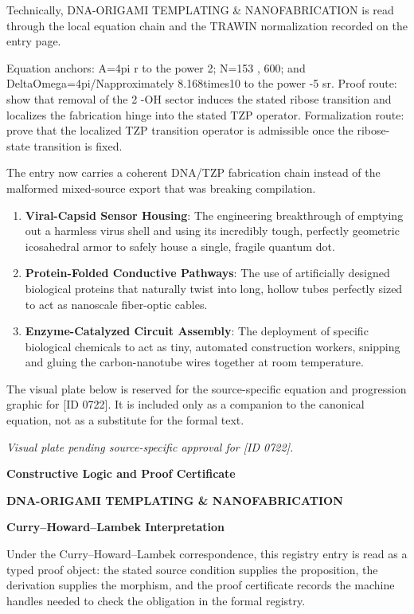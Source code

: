Technically, DNA-ORIGAMI TEMPLATING \& NANOFABRICATION is read through the local equation chain and the TRAWIN normalization recorded on the entry page.

Equation anchors: A=4pi r to the power 2; N=153 , 600; and DeltaOmega=4pi/Napproximately 8.168times10 to the power -5 sr. Proof route: show that removal of the 2 -OH sector induces the stated ribose transition and localizes the fabrication hinge into the stated TZP operator. Formalization route: prove that the localized TZP transition operator is admissible once the ribose-state transition is fixed.

The entry now carries a coherent DNA/TZP fabrication chain instead of the malformed mixed-source export that was breaking compilation.
\endgroup

\begin{enumerate}[leftmargin=1.6em,itemsep=6pt,topsep=4pt]
\item \textbf{Viral-Capsid Sensor Housing}: The engineering breakthrough of emptying out a harmless virus shell and using its incredibly tough, perfectly geometric icosahedral armor to safely house a single, fragile quantum dot.
\item \textbf{Protein-Folded Conductive Pathways}: The use of artificially designed biological proteins that naturally twist into long, hollow tubes perfectly sized to act as nanoscale fiber-optic cables.
\item \textbf{Enzyme-Catalyzed Circuit Assembly}: The deployment of specific biological chemicals to act as tiny, automated construction workers, snipping and gluing the carbon-nanotube wires together at room temperature.
\end{enumerate}

\begingroup\footnotesize\sloppy
The visual plate below is reserved for the source-specific equation and progression graphic for [ID 0722]. It is included only as a companion to the canonical equation, not as a substitute for the formal text.
\par\endgroup
\begingroup\footnotesize\itshape
Visual plate pending source-specific approval for [ID 0722].
\par\endgroup

\clearpage
\begingroup\tzpsupportsetup
\noindent\textbf{\fontsize{10.8pt}{12.8pt}\selectfont [ID 0722] Constructive Logic and Proof Certificate}\par
\noindent\textbf{\fontsize{10pt}{12pt}\selectfont DNA-ORIGAMI TEMPLATING \& NANOFABRICATION}\par
\vspace{0.45em}
\begingroup
\footnotesize
\setlength{\parskip}{0.22em}
\setlength{\parindent}{0pt}
\noindent\textbf{Curry--Howard--Lambek Interpretation}\par
Under the Curry--Howard--Lambek correspondence, this registry entry is read as a typed proof
object: the stated source condition supplies the proposition, the derivation supplies the
morphism, and the proof certificate records the machine handles needed to check the obligation
in the formal registry.

